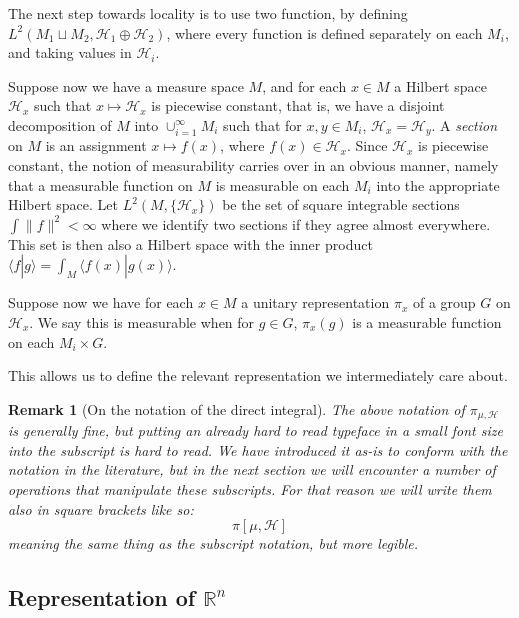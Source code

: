 \documentclass[
  12pt
]{article}
\theoremstyle{plain}
\newtheorem*{rk}{Remark}
\newcommand{\bbr}{\ensuremath{\mathbb{R}}\xspace}
\newcommand{\hilb}{\ensuremath{\mathscr{H}}\xspace}
\begin{document}

  The next step towards locality is to use two function, by defining
  $L^2(M_1 \sqcup M_2, \mathscr{H}_1 \oplus \mathscr{H}_2)$, where every
  function is defined separately on each $M_i$, and taking values in
  $\mathscr{H}_i$.


  Suppose now we have a measure space $M$, and for each $x \in M$ a
  Hilbert space $\mathscr{H}_x$ such that $x \mapsto \mathscr{H}_x$ is
  piecewise constant, that is, we have a disjoint decomposition of $M$
  into $\cup_{i=1}^{\infty} M_i$ such that for $x,y \in M_i$,
  $\mathscr{H}_x = \mathscr{H}_y$. 
  A \emph{section} on $M$ is an assignment $x \mapsto f(x)$, where
  $f(x) \in \mathscr{H}_x$. Since $\mathscr{H}_x$ is piecewise
  constant, the notion of measurability carries over in an obvious manner,
  namely that a measurable function on $M$ is measurable on each $M_i$
  into the appropriate Hilbert space. Let $L^2(M, \{\mathscr{H}_x\})$ be
  the set of square integrable sections $\int \| f \|^2 < \infty$ where
  we identify two sections if they agree almost everywhere. This set is
  then also a Hilbert space with the inner product
  $\langle f | g \rangle = \int_M \langle f(x) | g(x) \rangle$.

  Suppose now we have for each $x \in M$ a unitary representation
  $\pi_x$ of a group $G$ on $\mathscr{H}_x$. We say this is
  measurable when for $g \in G$, $\pi_x(g)$ is a measurable function
  on each $M_i \times G$.

  This allows us to define the relevant representation we intermediately
  care about.

  \begin{rk}[On the notation of the direct integral]
    \label{rem:integral-notation}
    The above notation of $\pi_{\mu, \hilb}$ is generally fine, but putting an
    already hard to read typeface in a small font size into the subscript is
    hard to read. We have introduced it as-is to conform with the notation in
    the literature, but in the next section we will encounter a number of
    operations that manipulate these subscripts. For that reason we will write
    them also in square brackets like so:
    $$
    \pi[\mu, \hilb]
    $$
    meaning the same thing as the subscript notation, but more legible.
  \end{rk}



  \hypertarget{representation-of-rn}{%
  \subsection{Representation of \texorpdfstring{$\bbr^n$}{R\^{}n}}\label{representation-of-rn}}
\end{document}
